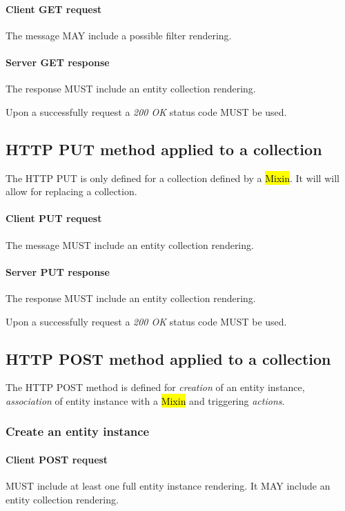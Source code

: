 \documentclass[10pt,a4paper]{article}
\begin{document}
\paragraph{Client GET request}
The message MAY include a possible filter rendering.

\paragraph{Server GET response}
The response MUST include an entity collection rendering.

Upon a successfully request a \emph{200 OK} status code MUST be used.

\subsection{HTTP PUT method applied to a collection}
The HTTP PUT is only defined for a collection defined by a \hl{Mixin}. It will will allow for replacing a collection.

\paragraph{Client PUT request}
The message MUST include an entity collection rendering.

\paragraph{Server PUT response}
The response MUST include an entity collection rendering.

Upon a successfully request a \emph{200 OK} status code MUST be used.

\subsection{HTTP POST method applied to a collection}
The HTTP POST method is defined for {\em creation} of an entity instance, {\em association} of entity instance with a \hl{Mixin} and triggering {\em actions}.

\subsubsection{Create an entity instance}

\paragraph{Client POST request}
MUST include at least one full entity instance rendering. It MAY include an entity collection rendering.
\end{document}
